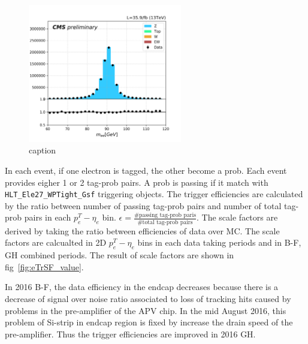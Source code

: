 \begin{figure}
    \centering
    \includegraphics[width=0.6\textwidth]{chapters/Appendix/sectionEleTrigger/figures/dileptonMass_tag30.png}
    \caption{caption}
    \label{fig:appendix:ele27TriggerSF}
\end{figure}

In each event, if one electron is tagged, the other become a prob. Each event provides eigher 1 or 2 tag-prob pairs.
A prob is passing if it match with \texttt{HLT\_Ele27\_WPTight\_Gsf} triggering objects.
The trigger efficiencies are calculated by the ratio between number of passing tag-prob pairs and number of 
total tag-prob pairs in each $p^T_e-\eta_e$ bin. $\epsilon = \frac{ \text{\# passing tag-prob paris} } { \text{\# total tag-prob pairs}}$.
The scale factors are derived by taking the ratio between efficiencies of data over MC.
The scale factors are calcualted in 2D $p^T_e-\eta_e$ bins in each data taking periods and in B-F, GH combined periods.
The result of scale factors are shown in fig~\ref{fig:eTrSF_value}.

In 2016 B-F, the data efficiency in the endcap decreases because there is a decrease of signal over noise ratio associated 
to loss of	tracking hits caused by problems in the pre-amplifier of the APV chip. 
In the mid August 2016, this problem of Si-strip in endcap region is fixed by increase the drain speed of the pre-amplifier. Thus the 
trigger efficiencies are improved in 2016 GH. 


